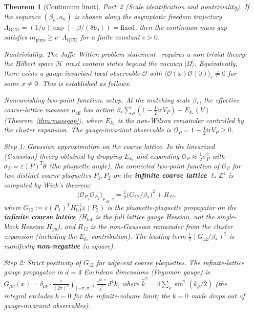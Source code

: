 \documentclass[11pt]{article}
\newtheorem{theorem}{Theorem}[section]
\theoremstyle{definition}
\newcommand{\tr}{\mathrm{tr}}
\newcommand{\Z}{\mathbb{Z}}
\newcommand{\Lam}{\Lambda_{\mathrm{QCD}}}
\begin{document}
\begin{theorem}[Continuum limit]
\emph{Part~2 (Scale identification and nontriviality).}
If the sequence $(\beta_n,a_n)$ is chosen along the
asymptotic freedom trajectory
$\Lam=(1/a)\exp(-\beta/(8b_0))=\mathrm{fixed}$,
then the continuum mass gap satisfies $m_{\mathrm{phys}}\ge c\cdot\Lam$
for a finite constant $c>0$.

\emph{Nontriviality.}  The Jaffe--Witten problem
statement~\cite{JaffeWitten} requires a \emph{non-trivial}
theory: the Hilbert space $\mathcal{H}$ must contain states
beyond the vacuum $|\Omega\rangle$.  Equivalently, there exists
a gauge-invariant local observable $\mathcal{O}$ with
$\langle\mathcal{O}(x)\mathcal{O}(0)\rangle_c\ne 0$
for some $x\ne 0$.  This is established as follows.

\emph{Nonvanishing two-point function: setup.}
At the matching scale $\beta_*$, the effective coarse-lattice
measure $\mu_{\mathrm{eff}}$ has action
$\beta_*\sum_P(1-\frac{1}{2}\tr V_P)+E_{k_*}(V)$
(Theorem~\ref{thm:massgap}), where $E_{k_*}$ is the
non-Wilson remainder controlled by the cluster expansion.
The gauge-invariant observable is
$\mathcal{O}_P=1-\frac{1}{2}\tr V_P\ge 0$.

\emph{Step 1: Gaussian approximation on the coarse lattice.}
In the linearized (Gaussian) theory obtained by dropping
$E_{k_*}$ and expanding
$\mathcal{O}_P\approx\frac{1}{2}\sigma_P^2$
with $\sigma_P=\varepsilon(P)^T\theta$ (the plaquette angle),
the connected two-point function of $\mathcal{O}_P$
for two distinct coarse plaquettes $P_1,P_2$ on the
\textbf{infinite coarse lattice} $\ell_*\Z^4$ is
computed by Wick's theorem:
\begin{equation}\label{eq:two-pt-nontrivial}
\langle\mathcal{O}_{P_1}\mathcal{O}_{P_2}
\rangle_{\mu_{\mathrm{eff}},c}
=\tfrac{1}{2}\bigl(G_{12}/\beta_*\bigr)^2
+R_{12},
\end{equation}
where $G_{12}:=\varepsilon(P_1)^T H_{\mathrm{lat}}^{-1}
\varepsilon(P_2)$ is the plaquette-plaquette propagator
on the \textbf{infinite coarse lattice}
($H_{\mathrm{lat}}$ is the full lattice gauge Hessian,
\emph{not} the single-block Hessian $H_{yy}$),
and $R_{12}$ is the non-Gaussian remainder from the
cluster expansion (including the $E_{k_*}$ contribution).
The leading term $\frac{1}{2}(G_{12}/\beta_*)^2$ is
manifestly \textbf{non-negative} (a square).

\emph{Step 2: Strict positivity of $G_{12}$ for adjacent
coarse plaquettes.}
The infinite-lattice gauge propagator in $d=4$ Euclidean
dimensions (Feynman gauge) is
$G_{\mu\nu}(x)=\delta_{\mu\nu}\cdot
\frac{1}{(2\pi)^4}\int_{[-\pi,\pi]^4}
\frac{e^{ik\cdot x}}{\hat k^2}\,d^4k$,
where $\hat k^2=4\sum_\rho\sin^2(k_\rho/2)$
(the integral excludes $k=0$ for the infinite-volume
limit; the $k=0$ mode drops out of gauge-invariant
observables).


\end{theorem}
\end{document}
